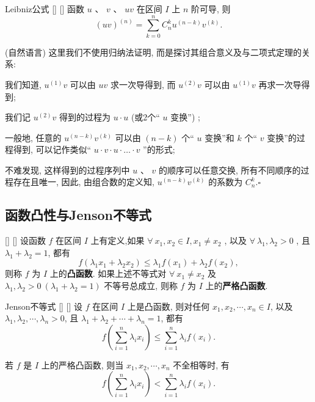 \documentclass[UTF8]{ctexart}
\begin{document}
            \begin{thm}
			    []
			    {Leibniz公式}
			    []
			    []
				函数 \(u\) 、 \(v\) 、 \(uv\) 在区间 \(I\) 上 \(n\) 阶可导, 则
				\[(uv)^{(n)} = \sum_{k=0}^{n} C_{n}^{k} u^{(n-k)} v^{(k)}.\]
			\end{thm}
			
			\begin{prf}
				 (自然语言) 这里我们不使用归纳法证明, 而是探讨其组合意义及与二项式定理的关系: 

				我们知道,  \(u^{(1)} v\) 可以由 \(uv\) 求一次导得到, 而 \(u^{(2)} v\) 可以由 \(u^{(1)} v\) 再求一次导得到; 

				我们记 \(u^{(2)} v\) 得到的过程为 \(u \cdot u\)  (或2个“ \(u\) 变换”) ;

				一般地, 任意的 \(u^{(n-k)} v^{(k)}\) 可以由 \((n-k)\) 个“ \(u\) 变换”和 \(k\) 个“ \(v\) 变换”的过程得到, 可以记作类似“ \(u\cdot v \cdot u \cdot \dots \cdot v\) ”的形式; 

				不难发现, 这样得到的过程序列中 \(u\) 、 \(v\) 的顺序可以任意交换, 所有不同顺序的过程存在且唯一, 
				因此, 由组合数的定义知,  \(u^{(n-k)} v^{(k)}\) 的系数为 \(C_{n}^{k}\).\(\square\)
			\end{prf}

			
		\subsection{函数凸性与Jenson不等式}
			\begin{dfn}
			    []
			    {}
			    []
			    []
				设函数 \(f\) 在区间 \(I\) 上有定义,如果 \(\forall \ x_1, x_2 \in I, x_1 \neq x_2\) , 以及 \( \forall \ \lambda_1, \lambda_2 > 0\) , 且 \(\lambda_1 + \lambda_2 = 1\), 都有
				\[
				f(\lambda_1 x_1 + \lambda_2 x_2) \leq \lambda_1 f(x_1) + \lambda_2 f(x_2),
				\]
				则称 \(f\) 为 \(I\) 上的\textbf{凸函数}. 如果上述不等式对 \(\forall \  x_1 \neq x_2\) 及 \(\lambda_1, \lambda_2 > 0 \ (\lambda_1 + \lambda_2 = 1)\) 不等号总成立, 则称 \(f\) 为 \(I\) 上的\textbf{严格凸函数}.					
			\end{dfn}
			
			\begin{thm}
			    []
			    {Jenson不等式}
			    []
			    []
				设 \(f\) 在区间 \(I\) 上是凸函数, 则对任何 \(x_1, x_2, \cdots, x_n \in I\), 以及 \(\lambda_1, \lambda_2, \cdots, \lambda_n > 0\), 且 \(\lambda_1 + \lambda_2 + \cdots + \lambda_n = 1\), 都有
				\[f\left(\sum_{i=1}^n \lambda_i x_i\right) \leq \sum_{i=1}^n \lambda_i f(x_i). \]

				若 \(f\) 是 \(I\) 上的严格凸函数, 则当 \(x_1, x_2, \cdots, x_n\) 不全相等时, 有
				\[f\left(\sum_{i=1}^n \lambda_i x_i\right) < \sum_{i=1}^n \lambda_i f(x_i). \]
			\end{thm}
\end{document}
